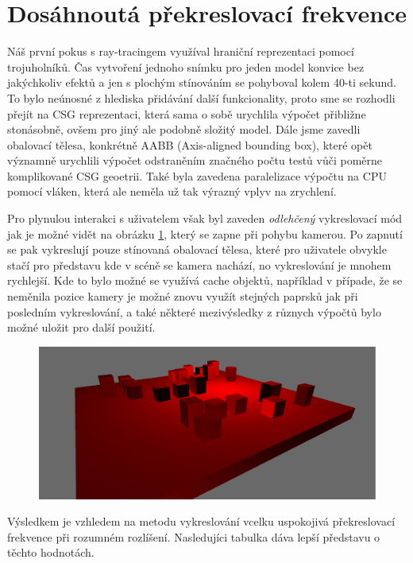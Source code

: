 \documentclass[12pt,a4paper,titlepage,final]{report}
\begin{document}
\section{Dosáhnoutá překreslovací frekvence}

Náš první pokus s ray-tracingem využíval hraniční reprezentaci pomocí trojuholníků. Čas vytvoření jednoho snímku pro jeden model konvice bez jakýchkoliv efektů a jen s plochým stínováním se pohyboval kolem 40-ti sekund. To bylo neúnosné z hlediska přidávání další funkcionality, proto sme se rozhodli přejít na CSG reprezentaci, která sama o sobě urychlila výpočet přibližne stonásobně, ovšem pro jiný ale podobně složitý model. Dále jsme zavedli obalovací tělesa, konkrétně AABB (Axis-aligned bounding box), které opět významně urychlili výpočet odstraněním značného počtu testů vůči poměrne komplikované CSG geoetrii. Také byla zavedena paralelizace výpočtu na CPU pomocí vláken, která ale neměla už tak výrazný vplyv na zrychlení.

Pro plynulou interakci s uživatelem však byl zaveden \textit{odlehčený} vykreslovací mód jak je možné vidět na obrázku \ref{camera}, který se zapne při pohybu kamerou. Po zapnutí se pak vykreslují pouze stínovaná obalovací tělesa, které pro uživatele obvykle stačí pro představu kde v scéně se kamera nachází, no vykreslování je mnohem rychlejší. Kde to bylo možné se využívá cache objektů, například v případe, že se neměnila pozice kamery je možné znovu využít stejných paprsků jak při posledním vykreslování, a také některé mezivýsledky z různych výpočtů bylo možné uložit pro další použití.

\begin{figure}[H]
	\centering
	\captionsetup{type=figure}
	\includegraphics[width=0.8\linewidth]{images/camera.png}
	\label{camera}
\end{figure}

Výsledkem je vzhledem na metodu vykreslování vcelku uspokojivá překreslovací frekvence při rozumném rozlíšení. Nasledujíci tabulka dáva lepší představu o těchto hodnotách.
\end{document}
